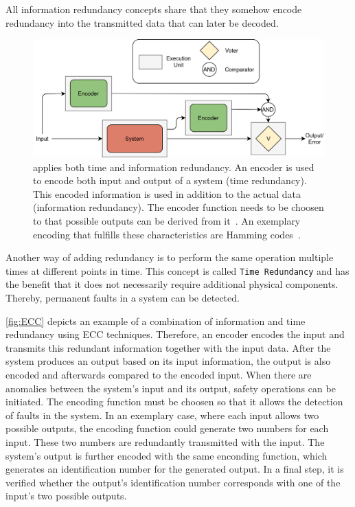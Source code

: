 All information redundancy concepts share that they somehow encode redundancy into the transmitted data that can later be decoded.

\begin{figure}[!hb]
	\centering
	\includegraphics[width=0.75\linewidth]{images/ECC}
	\caption{ applies both time and information redundancy. An encoder is used to encode both input and output of a system (time redundancy). This encoded information is used in addition to the actual data (information redundancy). The encoder function needs to be choosen to that possible outputs can be derived from it~\cite{Su2005ECC}. An exemplary encoding that fulfills these characteristics are Hamming codes~\cite{HammingCodes}.}
	\label{fig:ECC}
\end{figure}

Another way of adding redundancy is to perform the same operation multiple times at different points in time.
This concept is called \texttt{Time Redundancy} and has the benefit that it does not necessarily require additional physical components.
Thereby, permanent faults in a system can be detected.

\autoref{fig:ECC} depicts an example of a combination of information and time redundancy using \gls*{ECC} techniques.
Therefore, an encoder encodes the input and transmits this redundant information together with the input data.
After the system produces an output based on its input information, the output is also encoded and afterwards compared to the encoded input.
When there are anomalies between the system's input and its output, safety operations can be initiated.
The encoding function must be choosen so that it allows the detection of faults in the system.
In an exemplary case, where each input allows two possible outputs, the encoding function could generate two numbers for each input.
These two numbers are redundantly transmitted with the input.
The system's output is further encoded with the same enconding function, which generates an identification number for the generated output.
In a final step, it is verified whether the output's identification number corresponds with one of the input's two possible outputs.

